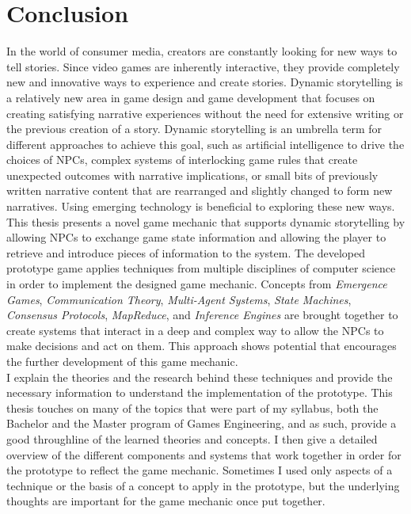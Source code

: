 \chapter{Conclusion}
In the world of consumer media, creators are constantly looking for new ways to tell stories. Since video games are inherently interactive, they provide completely new and innovative ways to experience and create stories. Dynamic storytelling is a relatively new area in game design and game development that focuses on creating satisfying narrative experiences without the need for extensive writing or the previous creation of a story. Dynamic storytelling is an umbrella term for different approaches to achieve this goal, such as artificial intelligence to drive the choices of NPCs, complex systems of interlocking game rules that create unexpected outcomes with narrative implications, or small bits of previously written narrative content that are rearranged and slightly changed to form new narratives. Using emerging technology is beneficial to exploring these new ways.\\
This thesis presents a novel game mechanic that supports dynamic storytelling by allowing NPCs to exchange game state information and allowing the player to retrieve and introduce pieces of information to the system. The developed prototype game applies techniques from multiple disciplines of computer science in order to implement the designed game mechanic. Concepts from \textit{Emergence Games}, \textit{Communication Theory}, \textit{Multi-Agent Systems}, \textit{State Machines}, \textit{Consensus Protocols}, \textit{MapReduce}, and \textit{Inference Engines} are brought together to create systems that interact in a deep and complex way to allow the NPCs to make decisions and act on them. This approach shows potential that encourages the further development of this game mechanic.\\
I explain the theories and the research behind these techniques and provide the necessary information to understand the implementation of the prototype. This thesis touches on many of the topics that were part of my syllabus, both the Bachelor and the Master program of Games Engineering, and as such, provide a good throughline of the learned theories and concepts. I then give a detailed overview of the different components and systems that work together in order for the prototype to reflect the game mechanic. Sometimes I used only aspects of a technique or the basis of a concept to apply in the prototype, but the underlying thoughts are important for the game mechanic once put together.\\
